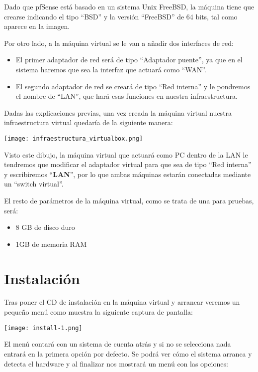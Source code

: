 Dado que pfSense está basado en un sistema Unix FreeBSD, la máquina tiene que crearse indicando el tipo “BSD” y la versión “FreeBSD” de 64 bits, tal como aparece en la imagen.

Por otro lado, a la máquina virtual se le van a añadir dos interfaces de red:

\begin{itemize}
    \item El primer adaptador de red será de tipo “Adaptador puente”, ya que en el sistema haremos que sea la interfaz que actuará como “WAN”.
    \item El segundo adaptador de red se creará de tipo “Red interna” y le pondremos el nombre de “LAN”, que hará esas funciones en nuestra infraestructura.
\end{itemize}

Dadas las explicaciones previas, una vez creada la máquina virtual nuestra infraestructura virtual quedaría de la siguiente manera:

\begin{center}
    \texttt{[image: infraestructura\_virtualbox.png]}
\end{center}

Visto este dibujo, la máquina virtual que actuará como PC dentro de la LAN le tendremos que modificar el adaptador virtual para que sea de tipo “Red interna” y escribiremos “\textbf{LAN}”, por lo que ambas máquinas estarán conectadas mediante un “switch virtual”.

El resto de parámetros de la máquina virtual, como se trata de una para pruebas, será:

\begin{itemize}
    \item 8 GB de disco duro
    \item 1GB de memoria RAM
\end{itemize}

\section{Instalación}
Tras poner el CD de instalación en la máquina virtual y arrancar veremos un pequeño menú como muestra la siguiente captura de pantalla:

\begin{center}
    \texttt{[image: install-1.png]}
\end{center}

El menú contará con un sistema de cuenta atrás y si no se selecciona nada entrará en la primera opción por defecto. Se podrá ver cómo el sistema arranca y detecta el  hardware y al finalizar nos mostrará un menú con las opciones:

